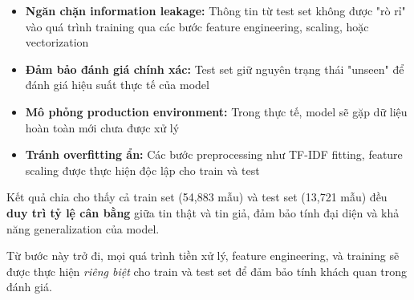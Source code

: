 \begin{itemize}
    \item \textbf{Ngăn chặn information leakage:} Thông tin từ test set không được "rò rỉ" vào quá trình training qua các bước feature engineering, scaling, hoặc vectorization
    \item \textbf{Đảm bảo đánh giá chính xác:} Test set giữ nguyên trạng thái "unseen" để đánh giá hiệu suất thực tế của model
    \item \textbf{Mô phỏng production environment:} Trong thực tế, model sẽ gặp dữ liệu hoàn toàn mới chưa được xử lý
    \item \textbf{Tránh overfitting ẩn:} Các bước preprocessing như TF-IDF fitting, feature scaling được thực hiện độc lập cho train và test
\end{itemize}

\noindent Kết quả chia cho thấy cả train set (54,883 mẫu) và test set (13,721 mẫu) đều \textbf{duy trì tỷ lệ cân bằng} giữa tin thật và tin giả, đảm bảo tính đại diện và khả năng generalization của model.

\noindent Từ bước này trở đi, mọi quá trình tiền xử lý, feature engineering, và training sẽ được thực hiện \textit{riêng biệt} cho train và test set để đảm bảo tính khách quan trong đánh giá.
